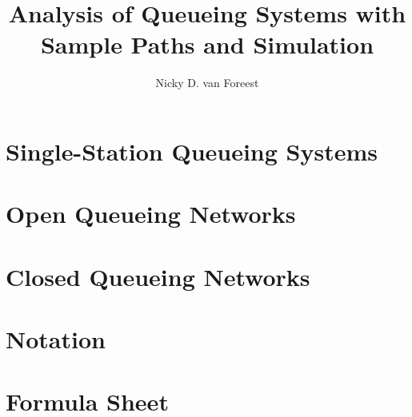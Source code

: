 \author{Nicky D. van  Foreest}
\title{Analysis of Queueing Systems with  Sample Paths and Simulation }


\maketitle
\tableofcontents



\chapter{Single-Station Queueing Systems}
\label{cha:single-stat-queu}



















%
 



%


\chapter{Open Queueing Networks}
\label{sec:notes-relat-chapt2}




%


\chapter{Closed Queueing Networks}
\label{ch3}



%

%


\chapter{Notation}
\label{sec:notation}


\chapter{Formula Sheet}

   




